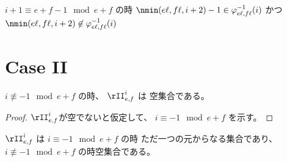 \begin{lemma}
\label{lm:main_lemma.case_b}
\leanok
$
i + 1 \equiv e + f - 1 \mod e + f
$
の時
$
\nmin (e \ell, f \ell, i+2) - 1
\in
\varphi_{e \ell, f \ell}^{-1}(i)
$
かつ
$
\nmin (e \ell, f \ell, i+2)
\not \in
\varphi_{e \ell, f \ell}^{-1}(i)
$
\end{lemma}

\section{Case II}

\begin{lemma}
\label{lm:setII_empty_if_not_dvd}
\leanok
$
i \not \equiv -1 \mod e + f
$
の時、
$
\rII_{e,f}^i
$
は
空集合である。
\end{lemma}

\begin{proof}
$\rII_{e,f}^i$が空でないと仮定して、
$
i \equiv -1 \mod e + f
$
を示す。
\end{proof}

\begin{lemma}
\label{lm:setII_dichotomy}
\leanok
$
\rII_{e,f}^i
$
は
$
i \equiv -1 \mod e + f
$
の時
ただ一つの元からなる集合であり、
$
i \not \equiv -1 \mod e + f
$
の時空集合である。
\end{lemma}

